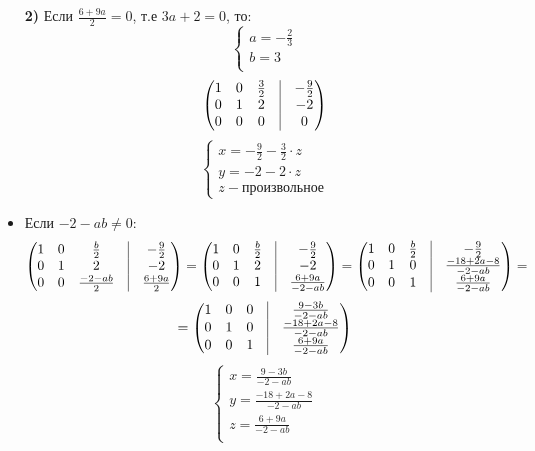 \documentclass[a4paper,12pt]{article}
\begin{document}
\begin{large}
\begin{itemize}
\textbf{2)} Если $\frac{6+9a}{2} = 0 $, т.е $3a+2 = 0$, то:
\[
\begin{cases}
a = -\frac{2}{3}\\
b = 3\\
\end{cases}
\]
\[
\begin{pmatrix}
1 & 0 & \frac{3}{2} & \vrule & -\frac{9}{2}\\
0 & 1 & 2 & \vrule & -2\\
0 & 0& 0& \vrule & 0\\
\end{pmatrix}
\]
\[
\begin{cases}
x =- \frac{9}{2} - \frac{3}{2} \cdot z\\
y = -2 - 2 \cdot z\\
z - \text{произвольное}
\end{cases}
\]
\item Если $-2 - ab\neq 0$:
\[
\begin{pmatrix}
1 & 0 & \frac{b}{2} & \vrule & -\frac{9}{2}\\
0 & 1 & 2 & \vrule & -2\\
0 & 0& \frac{-2 -ab}{2} & \vrule & \frac{6+9a}{2}\\
\end{pmatrix} =
\begin{pmatrix}
1 & 0 & \frac{b}{2} & \vrule & -\frac{9}{2}\\
0 & 1 & 2 & \vrule & -2\\
0 & 0& 1 & \vrule & \frac{6+9a}{-2-ab}\\
\end{pmatrix} =
\begin{pmatrix}
1 & 0 & \frac{b}{2} & \vrule & -\frac{9}{2}\\
0 & 1 & 0& \vrule & \frac{-18+2a-8}{-2-ab}\\
0 & 0& 1 & \vrule & \frac{6+9a}{-2-ab}\\
\end{pmatrix} =
\]
\[
=
\begin{pmatrix}
1 & 0 & 0 & \vrule & \frac{9-3b}{-2-ab}\\
0 & 1 & 0& \vrule & \frac{-18+2a-8}{-2-ab}\\
0 & 0& 1 & \vrule & \frac{6+9a}{-2-ab}\\
\end{pmatrix}
\]
\[
\begin{cases}
x =\frac{9-3b}{-2-ab}\\
y = \frac{-18+2a-8}{-2-ab}\\
z = \frac{6+9a}{-2-ab}\\

\end{cases}\]
\end{itemize}
\end{large}
\end{document}
